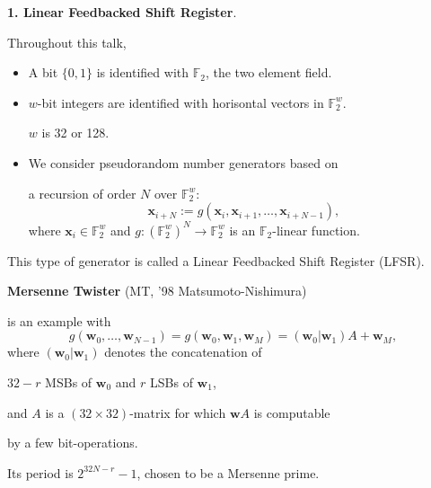 \documentclass[a4j,12pt,landscape]{jarticle}
\def\F2{{\mathbb F}_2}
\def\bx{{{\mathbf x}}}
\def\bw{{{\mathbf w}}}
\begin{document}
\newpage
{\bf 1. Linear Feedbacked Shift Register}.

Throughout this talk,
\begin{itemize}
\item
A bit $\{0,1\}$ is identified with 
$\F2$, the two element field.

\item
$w$-bit integers are identified with 
horisontal vectors in $\F2^{w}$.

$w$ is 32 or 128.

\item
We consider pseudorandom number generators
based on 

a recursion of order $N$ over $\F2^{w}$:
$$
\bx_{i+N}:=g(\bx_i, \bx_{i+1}, \ldots, \bx_{i+N-1}),
$$
where $\bx_i \in \F2^{w}$ and 
$g:(\F2^{w})^N \to \F2^{w}$ is an $\F2$-linear function.
\end{itemize}
This type of generator is called a Linear Feedbacked 
Shift Register (LFSR).

\newpage
{\bf Mersenne Twister} (MT, '98 Matsumoto-Nishimura)

is an example with
$$
g(\bw_0,\ldots,\bw_{N-1}) = g(\bw_0, \bw_1, \bw_M) = (\bw_0|\bw_1)A + \bw_M,
$$
where $(\bw_0|\bw_1)$ denotes
the concatenation of 
\begin{center}
$32-r$ MSBs of $\bw_0$ and $r$ LSBs of $\bw_1$,
\end{center}
and $A$ is a $(32\times 32)$-matrix 
for which $\bw A$ is computable 

by a few bit-operations.

Its period is $2^{32N-r}-1$, chosen to be a Mersenne prime.

\vskip 5mm
\end{document}
